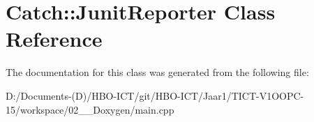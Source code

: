 \hypertarget{class_catch_1_1_junit_reporter}{}\section{Catch\+:\+:Junit\+Reporter Class Reference}
\label{class_catch_1_1_junit_reporter}


The documentation for this class was generated from the following file\+:\begin{DoxyCompactItemize}
\item 
D\+:/\+Documents-\/(\+D)/\+H\+B\+O-\/\+I\+C\+T/git/\+H\+B\+O-\/\+I\+C\+T/\+Jaar1/\+T\+I\+C\+T-\/\+V1\+O\+O\+P\+C-\/15/workspace/02\+\_\+\_\+\+Doxygen/main.\+cpp\end{DoxyCompactItemize}
